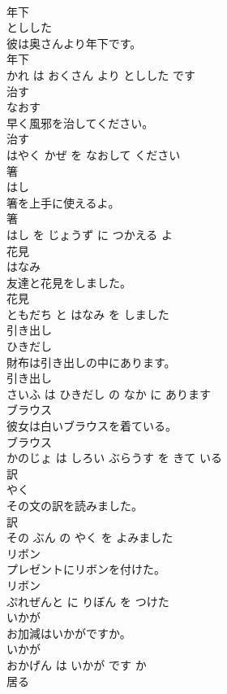 \documentclass[8pt]{extreport}
\begin{document}
\begin{CJK}{UTF8}{min}
\\	年下	
\\	としした			
\\	彼は奥さんより年下です。	
\\	年下 
\\	かれ は おくさん より としした です			
\\	治す	
\\	なおす			
\\	早く風邪を治してください。	
\\	治す 
\\	はやく かぜ を なおして ください			
\\	箸	
\\	はし			
\\	箸を上手に使えるよ。	
\\	箸 
\\	はし を じょうず に つかえる よ			
\\	花見	
\\	はなみ			
\\	友達と花見をしました。	
\\	花見 
\\	ともだち と はなみ を しました			
\\	引き出し	
\\	ひきだし			
\\	財布は引き出しの中にあります。	
\\	引き出し 
\\	さいふ は ひきだし の なか に あります			
\\	ブラウス	
\\	彼女は白いブラウスを着ている。	
\\	ブラウス 
\\	かのじょ は しろい ぶらうす を きて いる			
\\	訳	
\\	やく			
\\	その文の訳を読みました。	
\\	訳 
\\	その ぶん の やく を よみました			
\\	リボン	
\\	プレゼントにリボンを付けた。	
\\	リボン 
\\	ぷれぜんと に りぼん を つけた			
\\	いかが	
\\	お加減はいかがですか。	
\\	いかが 
\\	おかげん は いかが です か			
\\	居る	

\end{CJK}
\end{document}
